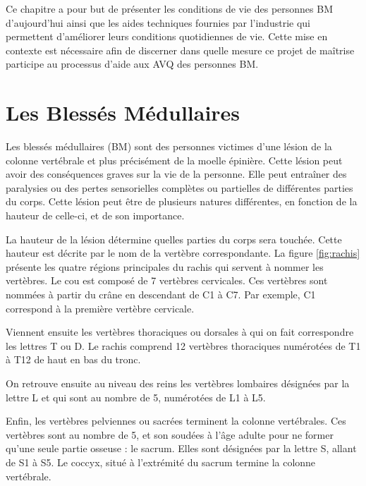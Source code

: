 \documentclass[letterpaper, twoside, 12pt, memoire, creativecommons, hyperref]{thETS}
\begin{document}
Ce chapitre a pour but de présenter les conditions de vie des personnes BM d'aujourd'hui ainsi que les aides techniques fournies par l'industrie qui permettent d'améliorer leurs conditions quotidiennes de vie. Cette mise en contexte est nécessaire afin de discerner dans quelle mesure ce projet de maîtrise participe au processus d'aide aux AVQ des personnes BM.


\section{Les Blessés Médullaires}

Les blessés médullaires (BM) sont des personnes victimes d'une lésion de la colonne vertébrale et plus précisément de la moelle épinière. Cette lésion peut avoir des conséquences graves sur la vie de la personne. Elle peut entraîner des paralysies ou des pertes sensorielles complètes ou partielles de différentes parties du corps. Cette lésion peut être de plusieurs natures différentes, en fonction de la hauteur de celle-ci, et de son importance. 

La hauteur de la lésion détermine quelles parties du corps sera touchée. Cette hauteur est décrite par le nom de la vertèbre correspondante. La figure \ref{fig:rachis} présente les quatre régions principales du rachis qui servent à nommer les vertèbres. Le cou est composé de 7 vertèbres cervicales. Ces vertèbres sont nommées à partir du crâne en descendant de C1 à C7. Par exemple, C1 correspond à la première vertèbre cervicale. 

Viennent ensuite les vertèbres thoraciques ou dorsales à qui on fait correspondre les lettres T ou D. Le rachis comprend 12 vertèbres thoraciques numérotées de T1 à T12 de haut en bas du tronc. 

On retrouve ensuite au niveau des reins les vertèbres lombaires désignées par la lettre L et qui sont au nombre de 5, numérotées de L1 à L5. 

Enfin, les vertèbres pelviennes ou sacrées terminent la colonne vertébrales. Ces vertèbres sont au nombre de 5, et son soudées à l'âge adulte pour ne former qu'une seule partie osseuse : le sacrum. Elles sont désignées par la lettre S, allant de S1 à S5. Le coccyx, situé à l'extrémité du sacrum termine la colonne vertébrale.
\end{document}
